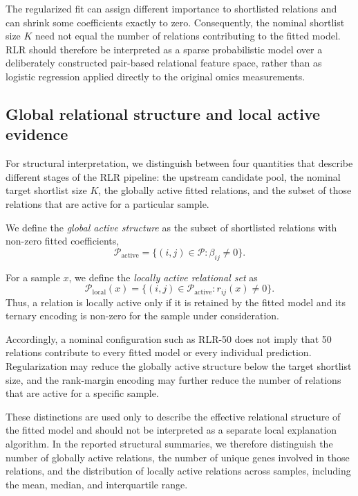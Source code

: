 \documentclass[journal]{IEEEtran}
\begin{document}
The regularized fit can assign different importance to shortlisted relations and can shrink some coefficients exactly to zero. Consequently, the nominal shortlist size $K$ need not equal the number of relations contributing to the fitted model. RLR should therefore be interpreted as a sparse probabilistic model over a deliberately constructed pair-based relational feature space, rather than as logistic regression applied directly to the original omics measurements.


\subsection{Global relational structure and local active evidence}

For structural interpretation, we distinguish between four quantities that describe different stages of the RLR pipeline: the upstream candidate pool, the nominal target shortlist size $K$, the globally active fitted relations, and the subset of those relations that are active for a particular sample.

We define the \emph{global active structure} as the subset of shortlisted relations with non-zero fitted coefficients,
\[
\mathcal{P}_{\mathrm{active}}
=
\{(i,j)\in\mathcal{P}:\beta_{ij}\neq 0\}.
\]

For a sample $x$, we define the \emph{locally active relational set} as
\[
\mathcal{P}_{\mathrm{local}}(x)
=
\{(i,j)\in\mathcal{P}_{\mathrm{active}}:r_{ij}(x)\neq 0\}.
\]
Thus, a relation is locally active only if it is retained by the fitted model and its ternary encoding is non-zero for the sample under consideration.

Accordingly, a nominal configuration such as RLR-50 does not imply that 50 relations contribute to every fitted model or every individual prediction. Regularization may reduce the globally active structure below the target shortlist size, and the rank-margin encoding may further reduce the number of relations that are active for a specific sample.

These distinctions are used only to describe the effective relational structure of the fitted model and should not be interpreted as a separate local explanation algorithm. In the reported structural summaries, we therefore distinguish the number of globally active relations, the number of unique genes involved in those relations, and the distribution of locally active relations across samples, including the mean, median, and interquartile range.
\end{document}

